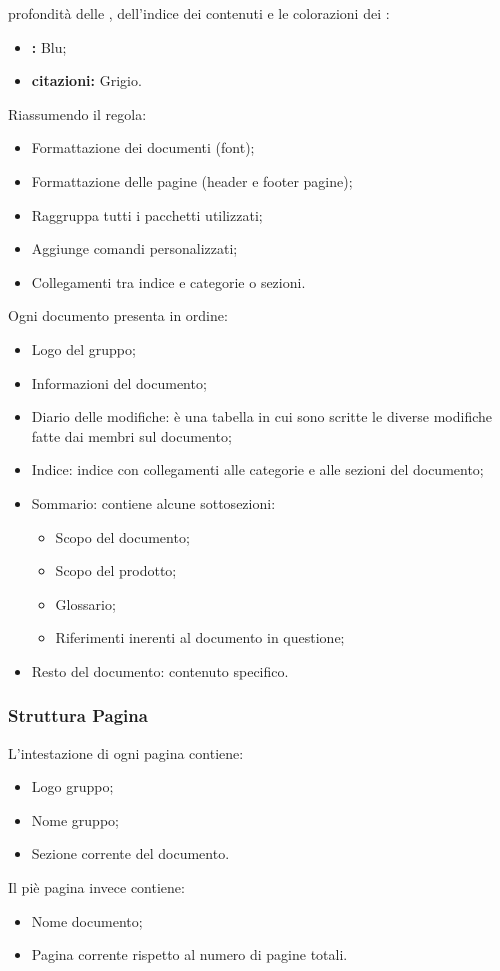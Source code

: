 \documentclass{scalatekids-article}
\begin{document}
profondità delle , dell'indice dei contenuti e le colorazioni dei
:
\begin{itemize}
    \item\textbf{:} Blu;
    \item\textbf{citazioni:} Grigio.
\end{itemize}
Riassumendo il  regola:
\begin{itemize}
    \item Formattazione dei documenti (font);
    \item Formattazione delle pagine (header e footer pagine);
    \item Raggruppa tutti i pacchetti utilizzati;
    \item Aggiunge comandi personalizzati;
    \item Collegamenti tra indice e categorie o sezioni.
\end{itemize}
Ogni documento presenta in ordine:
\begin{itemize}
    \item Logo del gruppo;
    \item Informazioni del documento;
    \item Diario delle modifiche: è una tabella in cui sono scritte le diverse modifiche fatte dai membri sul documento;
    \item Indice: indice con collegamenti alle categorie e alle sezioni del documento;
    \item Sommario: contiene alcune sottosezioni:
        \begin{itemize}
            \item Scopo del documento;
            \item Scopo del prodotto;
            \item Glossario;
            \item Riferimenti inerenti al documento in questione;
        \end{itemize}
    \item Resto del documento: contenuto specifico.
\end{itemize}

\subsubsection{Struttura Pagina}

L'intestazione di ogni pagina contiene:
\begin{itemize}
    \item Logo gruppo;
    \item Nome gruppo;
    \item Sezione corrente del documento.
\end{itemize}
Il piè pagina invece contiene:
\begin{itemize}
    \item Nome documento;
    \item Pagina corrente rispetto al numero di pagine totali.
\end{itemize}
\end{document}
